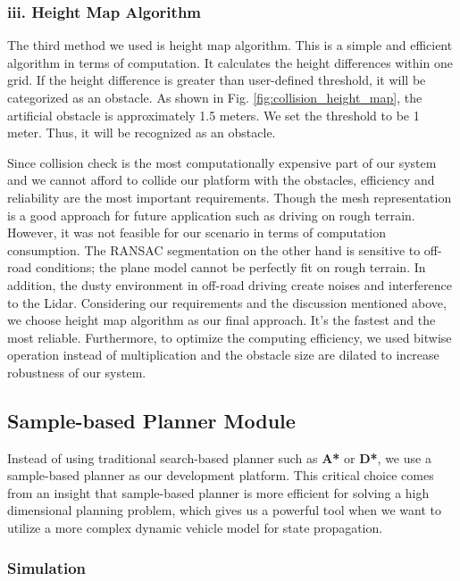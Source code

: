 \documentclass[../thesis.tex]{subfiles}
\begin{document}
\subsubsection{iii. Height Map Algorithm}
The third method we used is height map algorithm. This is a simple and efficient algorithm in terms of computation. It calculates the height differences within one grid. If the height difference is greater than user-defined threshold, it will be categorized as an obstacle. As shown in Fig. \ref{fig:collision_height_map}, the artificial obstacle is approximately 1.5 meters. We set the threshold to be 1 meter. Thus, it will be recognized as an obstacle.
 
 
Since collision check is the most computationally expensive part of our system and we cannot afford to collide our platform with the obstacles, efficiency and reliability are the most important requirements. Though the mesh representation is a good approach for future application such as driving on rough terrain. However, it was not feasible for our scenario in terms of computation consumption. The RANSAC segmentation on the other hand is sensitive to off-road conditions; the plane model cannot be perfectly fit on rough terrain. In addition, the dusty environment in off-road driving create noises and interference to the Lidar. Considering our requirements and the discussion mentioned above, we choose height map algorithm as our final approach. It’s the fastest and the most reliable. Furthermore, to optimize the computing efficiency, we used bitwise operation instead of multiplication and the obstacle size are dilated to increase robustness of our system.
 
\subsection{Sample-based Planner Module}
 
Instead of using traditional search-based planner such as \textbf{A*} or \textbf{D*}, we use a sample-based planner as our development platform. This critical choice comes from an insight that sample-based planner is more efficient for solving a high dimensional planning problem, which gives us a powerful tool when we want to utilize a more complex dynamic vehicle model for state propagation.
 
\subsubsection{Simulation}
 
\end{document}
